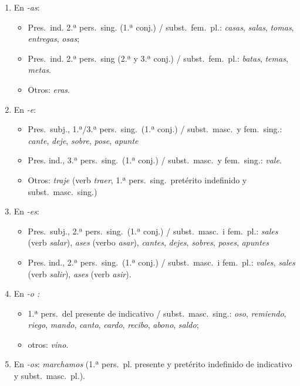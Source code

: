 {\begin{enumerate}
\begin{enumerate}
\item En \emph{-as}: \begin{itemize} \item Pres.\ ind. 2.ª pers.\ sing. (1.ª conj.) / subst.\ fem.\ pl.: \emph{casas}, \emph{salas}, \emph{tomas}, \emph{entregas}, \emph{osas}; \item Pres.\ ind. 2.ª pers.\ sing (2.ª y 3.ª conj.) / subst.\ fem.\ pl.: \emph{batas}, \emph{temas}, \emph{metas}. \item Otros: \emph{eras}. \end{itemize} 

\item En \emph{-e}: \begin{itemize} \item Pres.\ subj., 1.ª/3.ª pers.\ sing.\ (1.ª conj.) / subst.\ masc.\  y fem.\ sing.: \emph{cante}, \emph{deje}, \emph{sobre}, \emph{pose}, \emph{apunte} \item Pres. ind., 3.ª pers.\ sing.\ (1.ª conj.) / subst.\ masc.\  y fem.\ sing.: \emph{vale}. \item Otros: \emph{traje} (verb \emph{traer}, 1.ª pers.\ sing.\ pretérito indefinido y subst.\ masc.\ sing.) \end{itemize} 

\item En \emph{-es}: \begin{itemize} \item Pres.\ subj., 2.ª pers.\ sing.\ (1.ª conj.) / subst.\ masc.\  i fem.\ pl.: \emph{sales} (verb \emph{salar}), \emph{ases} (verbo \emph{asar}), \emph{cantes}, \emph{dejes}, \emph{sobres}, \emph{poses}, \emph{apuntes} \item Pres. ind., 2.ª pers.\ sing.\ (1.ª conj.) / subst.\ masc.\  i fem.\ pl.: \emph{vales}, \emph{sales} (verb \emph{salir}), \emph{ases} (verb \emph{asir}). \end{itemize} 

\item En \emph{-o :} \begin{itemize} \item 1.ª pers.\ del presente de indicativo / subst.\ masc.\ sing.: \emph{oso}, \emph{remiendo}, \emph{riego}, \emph{mando}, \emph{canto}, \emph{cardo}, \emph{recibo}, \emph{abono}, \emph{saldo}; \item otros: \emph{vino}. \end{itemize} 

\item En \emph{-os}:  \emph{marchamos} (1.ª pers.\ pl. presente y pretérito indefinido de indicativo y subst.\ masc.\ pl.). 


\end{enumerate}
\end{enumerate}}
